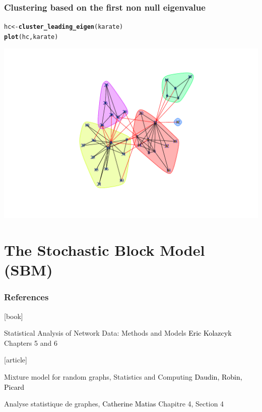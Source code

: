 \documentclass{beamer}\usepackage[]{graphicx}\usepackage[]{color}
\makeatletter
\newcommand{\hlstd}[1]{\textcolor[rgb]{0.345,0.345,0.345}{#1}}%
\newcommand{\hlkwb}[1]{\textcolor[rgb]{0.69,0.353,0.396}{#1}}%
\newcommand{\hlkwd}[1]{\textcolor[rgb]{0.737,0.353,0.396}{\textbf{#1}}}%
\newenvironment{kframe}{%
 \def\at@end@of@kframe{}%
 \ifinner\ifhmode%
  \def\at@end@of@kframe{\end{minipage}}%
  \begin{minipage}{\columnwidth}%
 \fi\fi%
 \def\FrameCommand##1{\hskip\@totalleftmargin \hskip-\fboxsep
 \colorbox{shadecolor}{##1}\hskip-\fboxsep
     \hskip-\linewidth \hskip-\@totalleftmargin \hskip\columnwidth}%
 \MakeFramed {\advance\hsize-\width
   \@totalleftmargin\z@ \linewidth\hsize
   \@setminipage}}%
 {\par\unskip\endMakeFramed%
 \at@end@of@kframe}
\newenvironment{knitrout}{}{} %
\makeatother
\begin{document}
\begin{frame}[fragile]
  \frametitle{Clustering based on the first non null eigenvalue}
  
\begin{knitrout}\scriptsize
{}\color{fgcolor}\begin{kframe}
\begin{alltt}
\hlstd{hc} \hlkwb{<-} \hlkwd{cluster_leading_eigen}\hlstd{(karate)}
\hlkwd{plot}\hlstd{(hc,karate)}
\end{alltt}
\end{kframe}
\includegraphics[width=.8\textwidth]{figures/unnamed-chunk-4-1} 

\end{knitrout}

\end{frame}

\section{The Stochastic Block Model (SBM)}

\begin{frame}
  \frametitle{References}

    \begin{thebibliography}{99}
      [book]

     Statistical Analysis of Network Data: Methods and Models
    \newblock \textcolor{black}{Eric Kolazcyk}
    \newblock \alert{Chapters 5 and 6}

      [article]

     Mixture model for random graphs, Statistics and Computing
    \newblock \textcolor{black}{Daudin, Robin, Picard}

     Analyse statistique de graphes,
    \newblock \textcolor{black}{Catherine Matias}
    \newblock \alert{Chapitre 4, Section 4}

    \end{thebibliography}

\end{frame}
\end{document}
